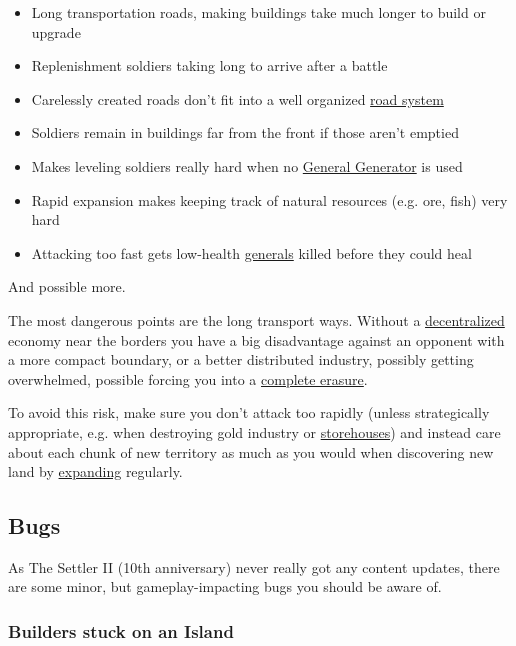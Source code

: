 \documentclass[12pt]{article}
\begin{document}
\begin{itemize}
    \item Long transportation roads, making buildings take much longer to build or upgrade
    \item Replenishment soldiers taking long to arrive after a battle
    \item Carelessly created roads don't fit into a well organized \hyperref[sec:roadsystem]{road system}
    \item Soldiers remain in buildings far from the front if those aren't emptied
    \item Makes leveling soldiers really hard when no \hyperref[sec:generalgenerator]{General Generator} is used
    \item Rapid expansion makes keeping track of natural resources (e.g. ore, fish) very hard
    \item Attacking too fast gets low-health \hyperref[sec:general]{generals} killed before they could heal
\end{itemize}

And possible more.

The most dangerous points are the long transport ways. Without a \hyperref[sec:decentralization]{decentralized} economy near the borders you have a big disadvantage against an opponent with a more compact boundary, or a better distributed industry, possibly getting overwhelmed, possible forcing you into a \hyperref[sec:completeerasure]{complete erasure}.

To avoid this risk, make sure you don't attack too rapidly (unless strategically appropriate, e.g. when destroying gold industry or \hyperref[sec:storehouse]{storehouses}) and instead care about each chunk of new territory as much as you would when discovering new land by \hyperref[sec:expanding]{expanding} regularly.

\subsection{Bugs}
\label{sec:bugs}

As The Settler II (10th anniversary) never really got any content updates, there are some minor, but gameplay-impacting bugs you should be aware of.

\subsubsection{Builders stuck on an Island}
\label{sec:buildersstuckonisland}
\end{document}
